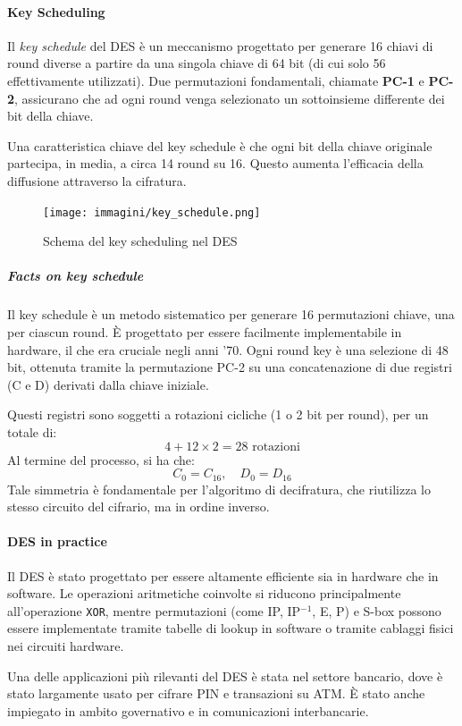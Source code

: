 \documentclass{report}
\begin{document}
\paragraph{Key Scheduling}

Il \textit{key schedule} del DES è un meccanismo progettato per generare 16 chiavi di round diverse a partire da una singola chiave di 64 bit (di cui solo 56 effettivamente utilizzati). Due permutazioni fondamentali, chiamate \textbf{PC-1} e \textbf{PC-2}, assicurano che ad ogni round venga selezionato un sottoinsieme differente dei bit della chiave.

Una caratteristica chiave del key schedule è che ogni bit della chiave originale partecipa, in media, a circa 14 round su 16. Questo aumenta l'efficacia della diffusione attraverso la cifratura.

\begin{figure}[h]
\centering
\texttt{[image: immagini/key\_schedule.png]}
\caption{Schema del key scheduling nel DES}
\end{figure}

\subparagraph{Facts on key schedule}

Il key schedule è un metodo sistematico per generare 16 permutazioni chiave, una per ciascun round. È progettato per essere facilmente implementabile in hardware, il che era cruciale negli anni '70. Ogni round key è una selezione di 48 bit, ottenuta tramite la permutazione PC-2 su una concatenazione di due registri (C e D) derivati dalla chiave iniziale.

Questi registri sono soggetti a rotazioni cicliche (1 o 2 bit per round), per un totale di:
\[ 4 + 12 \times 2 = 28 \text{ rotazioni} \]
Al termine del processo, si ha che:
\[ C_0 = C_{16}, \quad D_0 = D_{16} \]
Tale simmetria è fondamentale per l’algoritmo di decifratura, che riutilizza lo stesso circuito del cifrario, ma in ordine inverso.

\paragraph{DES in practice}

Il DES è stato progettato per essere altamente efficiente sia in hardware che in software. Le operazioni aritmetiche coinvolte si riducono principalmente all’operazione \texttt{XOR}, mentre permutazioni (come IP, IP$^{-1}$, E, P) e S-box possono essere implementate tramite tabelle di lookup in software o tramite cablaggi fisici nei circuiti hardware.

Una delle applicazioni più rilevanti del DES è stata nel settore bancario, dove è stato largamente usato per cifrare PIN e transazioni su ATM. È stato anche impiegato in ambito governativo e in comunicazioni interbancarie.
\end{document}
